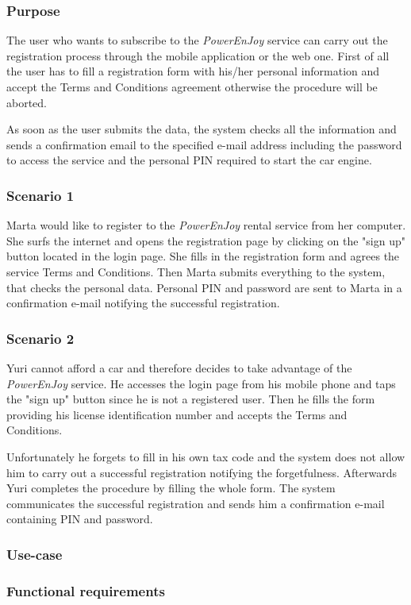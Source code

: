 \subsubsection{Purpose}
The user who wants to subscribe to the \emph{PowerEnJoy} service can carry out the registration process through the mobile application or the web one. First of all the user has to fill a registration form with his/her personal information and accept the Terms and Conditions agreement otherwise the procedure will be aborted.

As soon as the user submits the data, the system checks all the information and sends a confirmation email to the specified e-mail address including the password to access the service and the personal PIN required to start the car engine.

\subsubsection{Scenario 1}
Marta would like to register to the \emph{PowerEnJoy} rental service from her computer. She surfs the internet and opens the registration page by clicking on the "sign up" button located in the login page. She fills in the registration form and agrees the service Terms and Conditions. Then Marta submits everything to the system, that checks the personal data. Personal PIN and password are sent to Marta in a confirmation e-mail notifying the successful registration.

\subsubsection{Scenario 2}
Yuri cannot afford a car and therefore decides to take advantage of the \emph{PowerEnJoy} service. He accesses the login page from his mobile phone and taps the "sign up" button since he is not a registered user. Then he fills the form providing his license identification number and accepts the Terms and Conditions.

Unfortunately he forgets to fill in his own tax code and the system does not allow him to carry out a successful registration notifying the forgetfulness. Afterwards Yuri completes the procedure by filling the whole form. The system communicates the successful registration and sends him a confirmation e-mail containing PIN and password.

\subsubsection{Use-case}

\subsubsection{Functional requirements}